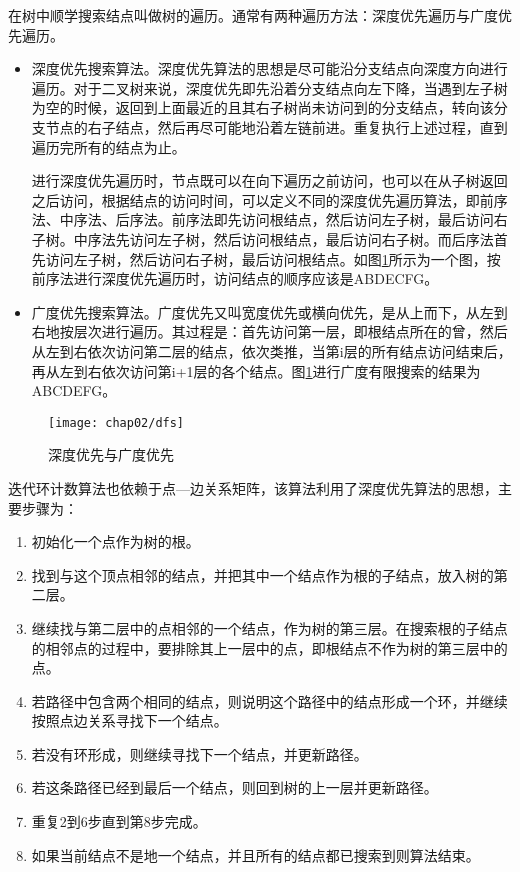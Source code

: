 在树中顺学搜索结点叫做树的遍历。通常有两种遍历方法：深度优先遍历与广度优先遍历。
\begin{itemize}

\item 深度优先搜索算法。深度优先算法的思想是尽可能沿分支结点向深度方向进行遍历。对于二叉树来说，深度优先即先沿着分支结点向左下降，当遇到左子树为空的时候，返回到上面最近的且其右子树尚未访问到的分支结点，转向该分支节点的右子结点，然后再尽可能地沿着左链前进。重复执行上述过程，直到遍历完所有的结点为止。

进行深度优先遍历时，节点既可以在向下遍历之前访问，也可以在从子树返回之后访问，根据结点的访问时间，可以定义不同的深度优先遍历算法，即前序法、中序法、后序法。前序法即先访问根结点，然后访问左子树，最后访问右子树。中序法先访问左子树，然后访问根结点，最后访问右子树。而后序法首先访问左子树，然后访问右子树，最后访问根结点。如图\ref{fig:dfs}所示为一个图，按前序法进行深度优先遍历时，访问结点的顺序应该是ABDECFG。

\item 广度优先搜索算法。广度优先又叫宽度优先或横向优先，是从上而下，从左到右地按层次进行遍历。其过程是：首先访问第一层，即根结点所在的曾，然后从左到右依次访问第二层的结点，依次类推，当第i层的所有结点访问结束后，再从左到右依次访问第i+1层的各个结点。图\ref{fig:dfs}进行广度有限搜索的结果为ABCDEFG。

\end{itemize}

\begin{figure}[H]
\centering
\texttt{[image: chap02/dfs]}
\caption{深度优先与广度优先}
\label{fig:dfs}
\end{figure}

迭代环计数算法也依赖于点---边关系矩阵，该算法利用了深度优先算法的思想，主要步骤为：
\begin{enumerate}
\item 初始化一个点作为树的根。
\item 找到与这个顶点相邻的结点，并把其中一个结点作为根的子结点，放入树的第二层。
\item 继续找与第二层中的点相邻的一个结点，作为树的第三层。在搜索根的子结点的相邻点的过程中，要排除其上一层中的点，即根结点不作为树的第三层中的点。
\item 若路径中包含两个相同的结点，则说明这个路径中的结点形成一个环，并继续按照点边关系寻找下一个结点。
\item 若没有环形成，则继续寻找下一个结点，并更新路径。
\item 若这条路径已经到最后一个结点，则回到树的上一层并更新路径。
\item 重复2到6步直到第8步完成。
\item 如果当前结点不是地一个结点，并且所有的结点都已搜索到则算法结束。
\end{enumerate}

